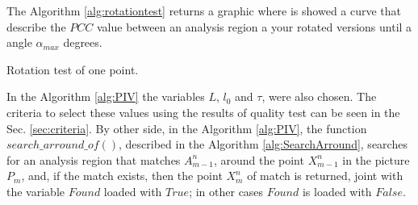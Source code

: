 The Algorithm \ref{alg:rotationtest} returns a graphic where
is showed a curve that describe the $PCC$ value between an
analysis region a your rotated versions until a angle $\alpha_{max}$ degrees.
\begin{algorithm}[!h]

\caption{Rotation test of one point.}
\label{alg:rotationtest} 
\end{algorithm}

In the Algorithm \ref{alg:PIV}  the variables $L$, $l_0$ and $\tau$, were also chosen.
The criteria to select these values using the results of quality test
can be seen in the Sec. \ref{sec:criteria}.
By other side, in the Algorithm \ref{alg:PIV}, the function $search\_arround\_of()$, 
described in the Algorithm \ref{alg:SearchArround}, searches for
an analysis region that matches $A_{m-1}^n$, around the point $X_{m-1}^n$ 
in the picture $P_m$, and, if the match exists, then the
point $X_{m}^n$ of match is returned, joint with the variable $Found$ loaded with $True$; in other cases
$Found$ is loaded with $False$. 

